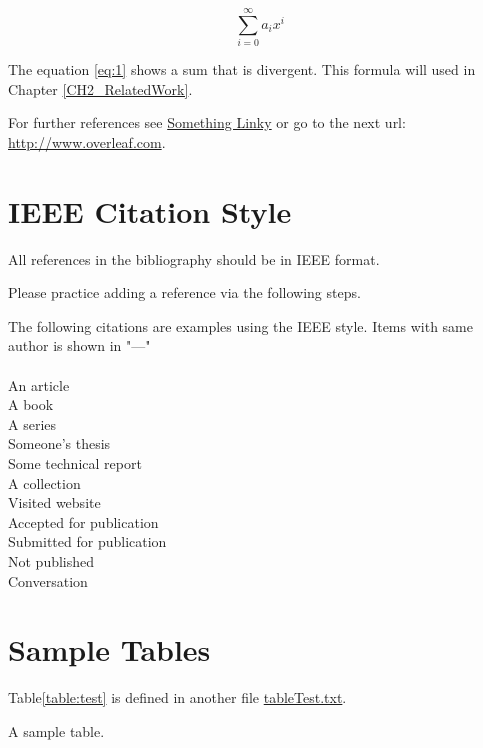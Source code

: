 \begin{equation}
\label{eq:1}
\sum_{i=0}^{\infty} a_i x^i
\end{equation}

The equation \ref{eq:1} shows a sum that is divergent. This formula 
will used in Chapter \ref{CH2_RelatedWork}.

For further references see \href{http://www.overleaf.com}{Something 
Linky} or go to the next url: \url{http://www.overleaf.com}.

\section{IEEE Citation Style}

All references in the bibliography should be in IEEE format.  

Please practice adding a reference via the following steps.  

The following citations are examples using the IEEE style. 
 Items with same author is shown in "---"\\
 \\

\noindent An article \cite{anarticle}\\
A book \cite{abook}\\
A series \cite{bookseries}\\
Someone's thesis \cite{thesis}\\
Some technical report \cite{report}\\
A collection \cite{collection}\\
Visited website \cite{website}\\
Accepted for publication \cite{acceptedpub}\\
Submitted for publication \cite{unpub}\\
Not published \cite{notpub}\\
Conversation \cite{conv}\\

\section{Sample Tables}

Table\ref{table:test} is defined in another file \href{run:./tableTest.tex}{tableTest.txt}. 

\begin{table}[h!]
\scriptsize
\renewcommand{\tabcolsep}{0.09cm}
\centering

\caption{A sample table.}
\label{table:test}
\end{table}


